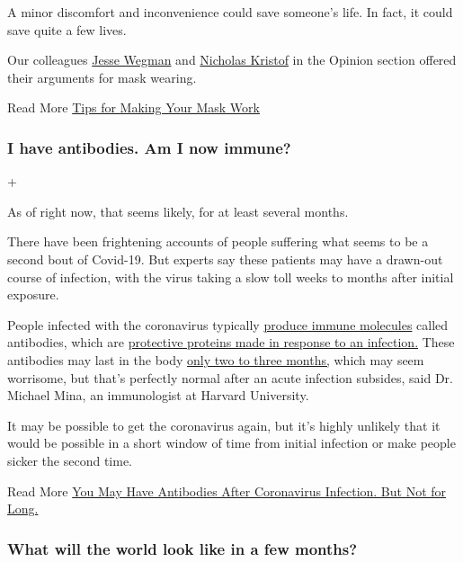 A minor discomfort and inconvenience could save someone's life. In fact,
it could save quite a few lives.

Our colleagues
\href{https://www.nytimes3xbfgragh.onion/2020/07/02/opinion/coronavirus-masks.html}{Jesse
Wegman} and
\href{https://www.nytimes3xbfgragh.onion/2020/07/01/opinion/coronavirus-face-masks.html?action=click\&module=RelatedLinks\&pgtype=Article}{Nicholas
Kristof} in the Opinion section offered their arguments for mask
wearing.

Read More
\href{https://www.nytimes3xbfgragh.onion/interactive/2020/06/25/burst/how-to-get-the-most-out-of-your-mask.html}{Tips
for Making Your Mask Work}

\hypertarget{i-have-antibodies-am-i-now-immune}{%
\subsubsection{I have antibodies. Am I now
immune?}\label{i-have-antibodies-am-i-now-immune}}

+

As of right now, that seems likely, for at least several months.

There have been frightening accounts of people suffering what seems to
be a second bout of Covid-19. But experts say these patients may have a
drawn-out course of infection, with the virus taking a slow toll weeks
to months after initial exposure.

People infected with the coronavirus typically
\href{https://www.nature.com/articles/s41586-020-2456-9}{produce immune
molecules} called antibodies, which are
\href{https://www.nytimes3xbfgragh.onion/2020/05/07/health/coronavirus-antibody-prevalence.html}{protective
proteins made in response to an infection.} These antibodies may last in
the body \href{https://www.nature.com/articles/s41591-020-0965-6}{only
two to three months,} which may seem worrisome, but that's perfectly
normal after an acute infection subsides, said Dr. Michael Mina, an
immunologist at Harvard University.

It may be possible to get the coronavirus again, but it's highly
unlikely that it would be possible in a short window of time from
initial infection or make people sicker the second time.

Read More
\href{https://www.nytimes3xbfgragh.onion/2020/07/22/health/covid-antibodies-herd-immunity.html}{You
May Have Antibodies After Coronavirus Infection. But Not for Long.}

\hypertarget{what-will-the-world-look-like-in-a-few-months}{%
\subsubsection{What will the world look like in a few
months?}\label{what-will-the-world-look-like-in-a-few-months}}

